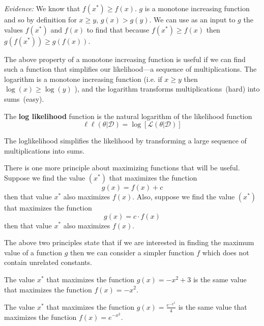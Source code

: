\textit{Evidence:}
We know that $f(x^{*}) \geq f(x)$.
$g$ is a monotone increasing function and so by definition for $x \geq y$, $g(x)>g(y)$. 
We can use as an input to $g$ the values $f(x^{*})$ and $f(x)$ to find that because $f(x^{*}) \geq f(x)$ then $g( f(x^{*}) ) \geq g( f(x) )$. 

The above property of a monotone increasing function is useful if we can find such a function that simplifies our likelihood---a sequence of multiplications. 
The logarithm is a monotone increasing function (i.e.  if $x \geq y$ then $\log(x) \geq \log(y)$ ), and the logarithm transforms multiplications~(hard) into sums~(easy).

The \textbf{log likelihood} function is the natural logarithm of the likelihood function
\begin{equation}
    \ell \ell (\theta | \mathcal{D}) = \log \left[ \mathcal{L} (\theta | \mathcal{D})  \right]
\end{equation}

The loglikelihood simplifies the likelihood by transforming a large sequence of multiplications into sums.

There is one more principle about maximizing functions that will be useful. 
Suppose we find the value $(x^{*})$ that maximizes the function 
\begin{equation}
    g(x) = f(x) + c
\end{equation}
then that value $x^{*}$ also maximizes $f(x)$.
Also, suppose we find the value $(x^{*})$ that maximizes the function 
\begin{equation}
    g(x) = c \cdot f(x)
\end{equation}
then that value $x^{*}$ also maximizes $f(x)$.

The above two principles state that if we are interested in finding the maximum value of a function $g$ then we can consider a simpler function $f$ which does not contain unrelated constants.

\ex The value $x^{*}$ that maximizes the function $g(x) = -x^{2} + 3$ is the same value that maximizes the function $f(x) = -x^{2}$. 

\ex The value $x^{*}$ that maximizes the function $g(x) = \frac{e^{-x^{2}}}{4}$ is the same value that maximizes the function $f(x) = e^{-x^{2}}$. 


